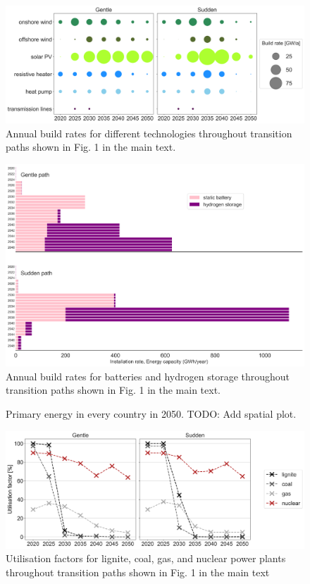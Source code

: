 \documentclass[3p]{elsarticle} %
\begin{document}
\begin{figure}[!h]
\centering
\includegraphics[width=\columnwidth]{figures/build_rates_Base.png}
\caption{Annual build rates for different technologies throughout transition paths shown in Fig. 1 in the main text. } \label{fig_build_rates} 
\end{figure}

\begin{figure}[!h]
\centering
\includegraphics[width=0.8\columnwidth]{figures/storage_expansion_Base.png}
\caption{Annual build rates for batteries and hydrogen storage throughout transition paths shown in Fig. 1 in the main text.} \label{fig_battery_hydrogen} 
\end{figure}

\begin{figure}[!h]
\centering
\caption{Primary energy in every country in 2050. \textcolor[rgb]{1,0,0}{TODO: Add spatial plot.} } \label{fig_spatial_plot} 
\end{figure}


\begin{figure}[!h]
\centering
\includegraphics[width=0.8\columnwidth]{figures/utilisation_factors_Base.png}
\caption{Utilisation factors for lignite, coal, gas, and nuclear power plants throughout transition paths shown in Fig. 1 in the main text} \label{fig_utilisation_factors} 
\end{figure}
\end{document}
